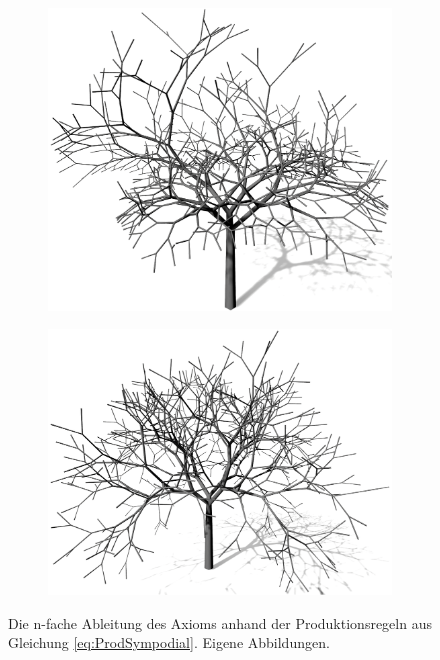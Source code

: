 \begin{figure} [hbtp]
\begin{subfigure}[t]{.45\textwidth}
		\caption{}
		\label{subfig:LS_Sympodial_2}
	\end{subfigure}	
	\begin{subfigure}[t]{.45\textwidth}
		\centering
		\includegraphics[width=\linewidth]{images/LS_Sympodial_3.png}
		\caption{}
		\label{subfig:LS_Sympodial_3}
	\end{subfigure}
	\begin{subfigure}[t]{.45\textwidth}
		\centering
		\includegraphics[width=\linewidth]{images/LS_Sympodial_4.png}
		\caption{}
		\label{subfig:LS_Sympodial_4}
	\end{subfigure}
	\caption{Die n-fache Ableitung des Axioms anhand der Produktionsregeln aus Gleichung \ref{eq:ProdSympodial}. Eigene Abbildungen.}
	\label{fig:LS_Sympodial}
\end{figure}


